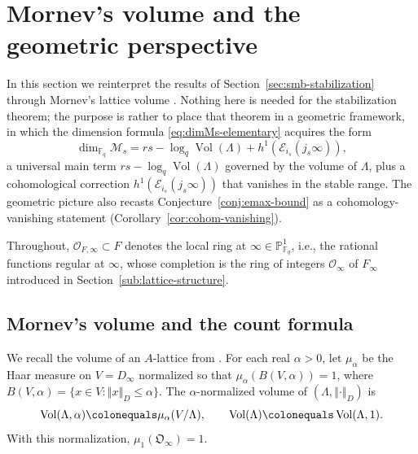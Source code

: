 \documentclass[12pt]{amsart}
\theoremstyle{definition}
\theoremstyle{remark}
\numberwithin{equation}{section}
\numberwithin{thm}{section}
\DeclareMathOperator{\Vol}{Vol}
\newcommand{\fO}{\mathfrak{O}}
\newcommand{\cE}{\mathcal{E}}
\newcommand{\cM}{\mathcal{M}}
\newcommand{\cO}{\mathcal{O}}
\newcommand{\F}{\mathbb{F}}
\newcommand{\PP}{\mathbb{P}}
\newcommand{\Fi}{F_\infty}
\newcommand{\La}{\Lambda}
\newcommand{\norm}[1]{\left\Vert#1\right\Vert}
\begin{document}
	\section{Mornev's volume and the geometric perspective}\label{sec:mornev-volume}
	
	In this section we reinterpret the results of Section~\ref{sec:smb-stabilization} through Mornev's lattice volume \cite{Mornev}. Nothing here is needed for the stabilization theorem; the purpose is rather to place that theorem in a geometric framework, in which the dimension formula \eqref{eq:dimMs-elementary} acquires the form
	\[
	\dim_{\F_q}\cM_s = rs - \log_q\Vol(\La) + h^1(\cE_{i_s}(j_s\infty)),
	\]
	a universal main term $rs - \log_q\Vol(\La)$ governed by the volume of $\La$, plus a cohomological correction $h^1(\cE_{i_s}(j_s\infty))$ that vanishes in the stable range. 
	The geometric picture also recasts Conjecture~\ref{conj:emax-bound} as a cohomology-vanishing statement (Corollary~\ref{cor:cohom-vanishing}).
	
	Throughout, $\cO_{F,\infty} \subset F$ denotes the local ring at $\infty \in \PP^1_{\F_q}$, i.e., the rational functions regular at $\infty$, whose completion is the ring of integers $\cO_\infty$ of $\Fi$ introduced in Section~\ref{sub:lattice-structure}.
	
	\subsection{Mornev's volume and the count formula}\label{sub:mornev-formula}
	
	We recall the volume of an $A$-lattice from \cite[\S 1.5]{Mornev}. For each real $\alpha > 0$, let $\mu_\alpha$ be the Haar measure on $V = D_\infty$ normalized so that $\mu_\alpha(B(V,\alpha)) = 1$, where $B(V,\alpha) = \{x \in V : \norm{x}_D \leq \alpha\}$. The $\alpha$-normalized volume of $(\La, \norm{\cdot}_D)$ is
	\[
	\Vol(\La, \alpha) \colonequals \mu_\alpha(V/\La), \qquad \Vol(\La) \colonequals \Vol(\La, 1).
	\]
	With this normalization, $\mu_1(\fO_\infty)=1$.
	
\end{document}
